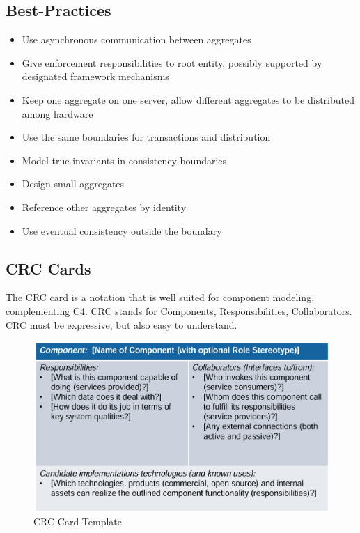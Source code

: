\documentclass[../Main.tex]{subfiles}
\begin{document}
\subsection{Best-Practices}
\begin{itemize}
    \item Use asynchronous communication between aggregates
    \item Give enforcement responsibilities to root entity, possibly supported by designated framework mechanisms
    \item Keep one aggregate on one server, allow different aggregates to be distributed among hardware
    \item Use the same boundaries for transactions and distribution
    \item Model true invariants in consistency boundaries
    \item Design small aggregates
    \item Reference other aggregates by identity
    \item Use eventual consistency outside the boundary
\end{itemize}

\newpage
\subsection{CRC Cards}
The CRC card is a notation that is well suited for component modeling, 
complementing C4. CRC stands for Components, Responsibilities, Collaborators.
CRC must be expressive, but also easy to understand.

\begin{figure}[H]
    \centering
    \includegraphics[width=1\linewidth]{Images/crc-card.png}
    \caption{CRC Card Template}
\end{figure}
\end{document}

